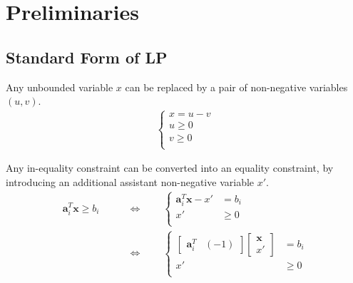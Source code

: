 \documentclass[twocolumn]{ctexart}
\begin{document}





\vspace{30pt}
\section{Preliminaries}

\subsection{Standard Form of LP}

Any unbounded variable $x$ can be replaced by a pair of non-negative variables $(u,v)$.
\begin{equation}
    \begin{aligned}
        \label{eq:var_unbounded_to_nonnegative}
        \begin{cases}
            x = u - v \\
            u \geq 0  \\
            v \geq 0  \\
        \end{cases}
    \end{aligned}
\end{equation}

Any in-equality constraint can be converted into an equality constraint,
by introducing an additional assistant non-negative variable $x'$.
\begin{equation}
    \begin{aligned}
        \label{eq:cons_inequal_to_equal}
        \mathbf{a}_i^T  \mathbf{x}  \geq  b_i
        & \qquad \Leftrightarrow \qquad
        \begin{cases}
            \mathbf{a}_i^T \mathbf{x}  -  x'  &=  b_i \\
            x' &\geq 0 \\
        \end{cases}
        \\
        & \qquad \Leftrightarrow \qquad
        \begin{cases}
            \begin{bmatrix} \mathbf{a}_i^T &  (-1) \end{bmatrix}
            \begin{bmatrix} \mathbf{x}     \\ x' \end{bmatrix}
            &= b_i
            \\
            x' &\geq 0 \\
        \end{cases}
    \end{aligned}
\end{equation}
\end{document}
